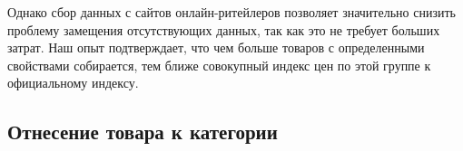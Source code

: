 Однако сбор данных с сайтов онлайн-ритейлеров позволяет значительно снизить проблему замещения отсутствующих данных, так как это не требует больших затрат. Наш опыт подтверждает, что чем больше товаров с определенными свойствами собирается, тем ближе совокупный индекс цен по этой группе к официальному индексу.

\subsection{Отнесение товара к категории}\label{subsec:ch2/sec2/sub3}

